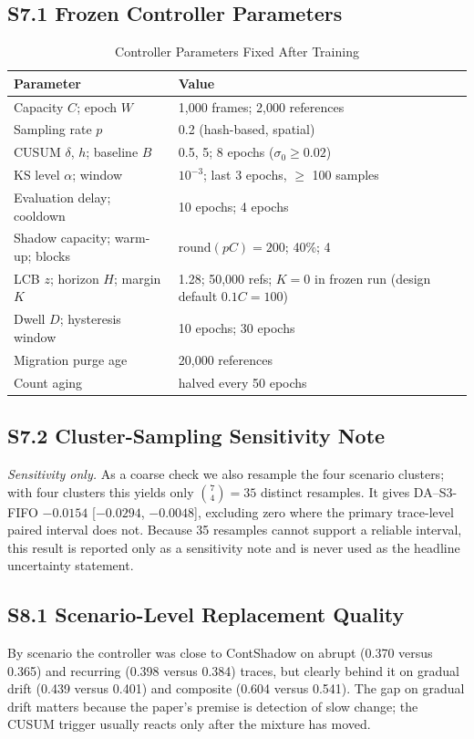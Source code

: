 \documentclass[journal,onecolumn]{IEEEtran}
\begin{document}
\subsection*{S7.1 Frozen Controller Parameters}
\begin{table}[!t]
\caption{Controller Parameters Fixed After Training}
\label{tab:params}
\footnotesize
\begin{tabular}{@{}p{}p{}@{}}
\toprule
Parameter & Value \\
\midrule
Capacity $C$; epoch $W$ & 1,000 frames; 2,000 references \\
Sampling rate $p$ & 0.2 (hash-based, spatial) \\
CUSUM $\delta$, $h$; baseline $B$ & 0.5, 5; 8 epochs ($\sigma_0 \ge 0.02$) \\
KS level $\alpha$; window & $10^{-3}$; last 3 epochs, $\ge$ 100 samples \\
Evaluation delay; cooldown & 10 epochs; 4 epochs \\
Shadow capacity; warm-up; blocks & $\mathrm{round}(pC) = 200$; 40\%; 4 \\
LCB $z$; horizon $H$; margin $K$ & 1.28; 50,000 refs; $K = 0$ in frozen run (design default $0.1C = 100$) \\
Dwell $D$; hysteresis window & 10 epochs; 30 epochs \\
Migration purge age & 20,000 references \\
Count aging & halved every 50 epochs \\
\bottomrule
\end{tabular}
\end{table}


\subsection*{S7.2 Cluster-Sampling Sensitivity Note}
\emph{Sensitivity only.} As a coarse check we also resample the
four scenario clusters; with four clusters this yields only $\binom{7}{4}=35$
distinct resamples. It gives DA--S3-FIFO $-0.0154$ [$-0.0294$, $-0.0048$],
excluding zero where the primary trace-level paired interval does not. Because
35 resamples cannot support a reliable interval, this result is reported only
as a sensitivity note and is never used as the headline uncertainty statement.


\subsection*{S8.1 Scenario-Level Replacement Quality}
By scenario the controller was close to ContShadow on abrupt (0.370 versus
0.365) and recurring (0.398 versus 0.384) traces, but clearly behind it on
gradual drift (0.439 versus 0.401) and composite (0.604 versus 0.541). The
gap on gradual drift matters because the paper's premise is detection of slow
change; the CUSUM trigger usually reacts only after the mixture has moved.
\end{document}
